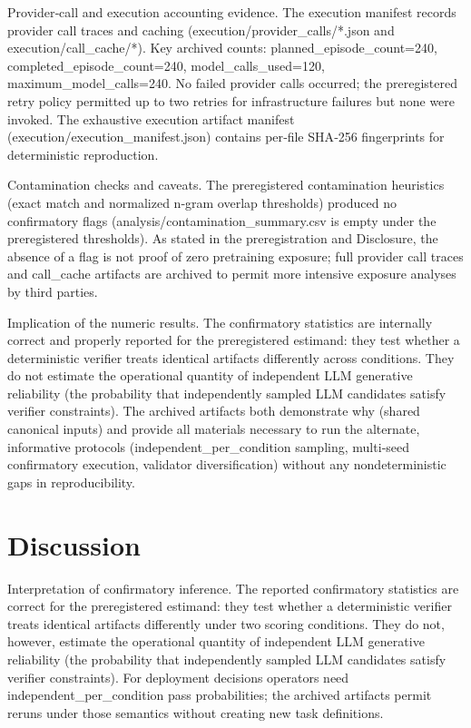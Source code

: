 \documentclass[conference]{IEEEtran}
\begin{document}
Provider‑call and execution accounting evidence. The execution manifest records provider call traces and caching (execution/provider\_calls/*.json and execution/call\_cache/*). Key archived counts: planned\_episode\_count=240, completed\_episode\_count=240, model\_calls\_used=120, maximum\_model\_calls=240. No failed provider calls occurred; the preregistered retry policy permitted up to two retries for infrastructure failures but none were invoked. The exhaustive execution artifact manifest (execution/execution\_manifest.json) contains per‑file SHA‑256 fingerprints for deterministic reproduction.

Contamination checks and caveats. The preregistered contamination heuristics (exact match and normalized n‑gram overlap thresholds) produced no confirmatory flags (analysis/contamination\_summary.csv is empty under the preregistered thresholds). As stated in the preregistration and Disclosure, the absence of a flag is not proof of zero pretraining exposure; full provider call traces and call\_cache artifacts are archived to permit more intensive exposure analyses by third parties.

Implication of the numeric results. The confirmatory statistics are internally correct and properly reported for the preregistered estimand: they test whether a deterministic verifier treats identical artifacts differently across conditions. They do not estimate the operational quantity of independent LLM generative reliability (the probability that independently sampled LLM candidates satisfy verifier constraints). The archived artifacts both demonstrate why (shared canonical inputs) and provide all materials necessary to run the alternate, informative protocols (independent\_per\_condition sampling, multi‑seed confirmatory execution, validator diversification) without any nondeterministic gaps in reproducibility.

\section{Discussion}
Interpretation of confirmatory inference. The reported confirmatory statistics are correct for the preregistered estimand: they test whether a deterministic verifier treats identical artifacts differently under two scoring conditions. They do not, however, estimate the operational quantity of independent LLM generative reliability (the probability that independently sampled LLM candidates satisfy verifier constraints). For deployment decisions operators need independent\_per\_condition pass probabilities; the archived artifacts permit reruns under those semantics without creating new task definitions.
\end{document}
